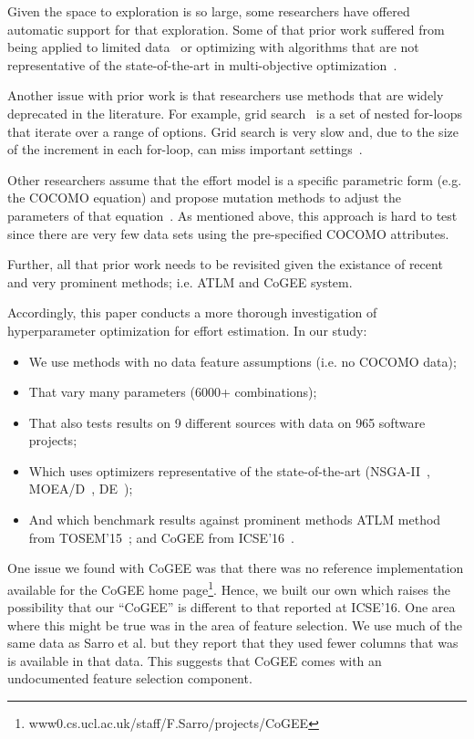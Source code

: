 \documentclass[10pt,conference]{IEEEtran}
\newcommand{\bi}{\begin{itemize}}
\newcommand{\ei}{\end{itemize}}
\begin{document}
Given the space to exploration is so large, some researchers have offered automatic support for that exploration.
Some of that prior work suffered from being applied to limited data~\cite{li09} or optimizing
with algorithms that are not representative of  the state-of-the-art in multi-objective optimization~\cite{li09}.

Another issue with prior work is that researchers use methods that are widely deprecated in the literature. 
For example,  grid search~\cite{dejaeger12,Song:2013}  is a set of
nested for-loops that iterate over  a range of options.
Grid search is very slow and, due to  the size of the increment in each for-loop, can miss important settings~\cite{Bergstra:2012}.

Other researchers assume that the effort model is a specific parametric form (e.g. the COCOMO equation)
and propose mutation methods to adjust the parameters of that equation~\cite{aljahdali2010software,Moeyersoms:2015,singh2012software,IJST70010,Rao14}. As mentioned above, this approach is
hard to test since there are very few data sets using the   pre-specified COCOMO attributes. 

Further, all that prior work needs to be revisited given the existance of recent and very prominent
methods; i.e.  ATLM and CoGEE system.


Accordingly, this paper conducts a  more thorough investigation of   hyperparameter  optimization for effort estimation. 
In our study:
\bi
\item
We  use methods with no   data
feature assumptions (i.e. no COCOMO data);
\item
That
 vary
many   parameters (6000+ combinations);
\item
That also  tests  results   on 9 different sources with data on 965 software projects; 
\item
Which  uses optimizers   representative of the  state-of-the-art 
(NSGA-II~\cite{deb02}, MOEA/D~\cite{Zhang07}, DE~\cite{storn1997differential});
\item
And which 
benchmark results 
against  prominent methods
  ATLM method from TOSEM'15~\cite{Whigham:2015}; and CoGEE from ICSE'16~\cite{sarro2016multi}.
\ei
One issue we found with CoGEE was that there was no reference implementation 
available for the CoGEE   home page\footnote{www0.cs.ucl.ac.uk/staff/F.Sarro/projects/CoGEE}. Hence, we   built our own   which
raises the possibility that our ``CoGEE'' is different to that reported at ICSE'16. One area
where this might be true was in the area of feature selection. We use much of the same
data as Sarro et al. but   they report that they used fewer columns that was is available in that  data.
This suggests that CoGEE comes with an undocumented feature selection component. 
\end{document}
